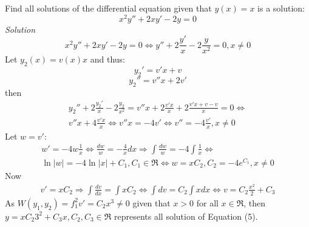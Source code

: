 \begin{example}
Find all solutions of the differential equation given that $y(x) = x$ is a
solution:
\begin{equation}
  x^2 y'' + 2 x y' - 2 y = 0 
\end{equation}
\noindent\emph{Solution}
\[
  x^2 y'' + 2 x y' - 2 y = 0 \Leftrightarrow y'' + 2 \frac{y'}{x} - 2
  \frac{y}{x^2} = 0, x \neq 0
\]
Let $y_2(x) = v(x) x$ and thus:
\[
  y_2' = v' x + v
\]
\[
  y_2'' = v'' x + 2 v'
\]
then
\begin{multline*}
  y_2'' + 2 \frac{y_2'}{x} - 2 \frac{y_2}{x^2} = v'' x + 2 \frac{v' x}{x} + 2
  \frac{v' x + v - v}{x} = 0 \Leftrightarrow \\ v'' x + 4 \frac{v' x}{x}
  \Leftrightarrow v'' x = - 4 v' \Leftrightarrow v'' = - 4 \frac{v'}{x}, x \neq 0
\end{multline*}
Let $w = v'$:
\begin{multline*}
  w' = -4 w \frac{1}{x} \Leftrightarrow \frac{dw}{w} = -\frac{4}{x} dx
  \Rightarrow \int \frac{dw}{w} = -4 \int \frac{1}{x} \Leftrightarrow \\
  \ln |w| = -4 \ln |x| + C_1, C_1 \in \Re \Leftrightarrow w = x C_2, C_2 = -4
  e^{C_1}, x \neq 0
\end{multline*}
Now
\begin{multline*}
  v' = x C_2 \Rightarrow \int \frac{dv}{dx} = \int x C_2 \Leftrightarrow \int
  dv = C_2 \int x dx \Leftrightarrow v = C_2 \frac{x^2}{2} + C_3
\end{multline*}
As $W(y_1, y_2) = f_1^2 v' = C_2 x^3 \neq 0$ given that $x > 0$ for all $x \in
\Re$, then $y = x C_2 3^2 + C_3 x, C_2, C_3 \in \Re$ represents all solution
of Equation (5).
\end{example}
